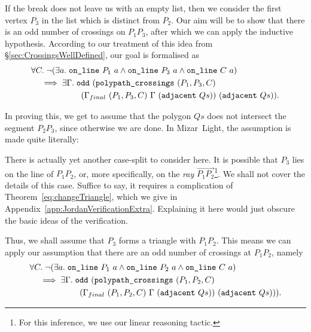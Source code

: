 If the break does not leave us with an empty list, then we consider the first vertex $P_3$ in the list which is distinct from $P_2$. Our aim will be to show that there is an odd number of crossings on $P_1P_3$, after which we can apply the inductive hypothesis. According to our treatment of this idea from \S\ref{sec:CrossingsWellDefined}, our goal is formalised as
\begin{equation*}
  \begin{aligned}
    &\forall C.\; \neg(\exists a.\; \texttt{on\_line}\ P_1\ a\wedge \texttt{on\_line}\ P_3\ a\wedge \texttt{on\_line}\ C\ a)\\
    &\quad \implies \exists \Gamma.\; \texttt{odd}\ (\texttt{polypath\_crossings}\ (P_1,P_3,C)\\
    &\qquad\qquad\qquad(\Gamma_{final}\ (P_1,P_3,C)\ \Gamma\ (\texttt{adjacent}\ Qs))\ (\texttt{adjacent}\ Qs)).
  \end{aligned}
\end{equation*}

In proving this, we get to assume that the polygon $Qs$ does not intersect the segment $P_2P_3$, since otherwise we are done. In Mizar~Light, the assumption is made quite literally:

\begin{center}\end{center}

There is actually yet another case-split to consider here. It is possible that $P_3$ lies on the line of $P_1P_2$, or, more specifically, on the \emph{ray} $\overrightarrow{P_1P_2}$\footnote{For this inference, we use our linear reasoning tactic.}. We shall not cover the details of this case. Suffice to say, it requires a complication of Theorem~\ref{eq:changeTriangle}, which we give in Appendix~\ref{app:JordanVerificationExtra}. Explaining it here would just obscure the basic ideas of the verification.

Thus, we shall assume that $P_3$ forms a triangle with $P_1P_2$. This means we can apply our assumption that there are an odd number of crossings at $P_1P_2$, namely
\begin{align*}&\forall C.\; \neg(\exists a.\; \texttt{on\_line}\ P_1\ a\wedge \texttt{on\_line}\ P_2\ a\wedge \texttt{on\_line}\ C\ a)\\
    &\quad\implies \exists \Gamma.\; \texttt{odd}\ (\texttt{polypath\_crossings}\ (P_1,P_2,C)\\
    &\qquad\qquad\qquad(\Gamma_{final}\ (P_1,P_2,C)\ \Gamma\ (\texttt{adjacent}\ Qs))\ (\texttt{adjacent}\ Qs))).
\end{align*}

